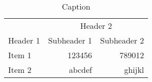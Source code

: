 \begin{table}
    \centering
    \caption{Caption}
    \label{tab:Subheadings}
    \begin{tabular}{lrr} \toprule
        & \multicolumn{2}{c}{Header 2} \\ \cmidrule{2-3}
        Header 1 & Subheader 1 & Subheader 2 \\ \midrule
        Item 1 & 123456 & 789012 \\
        Item 2 & abcdef & ghijkl \\ \bottomrule
    \end{tabular}
\end{table}